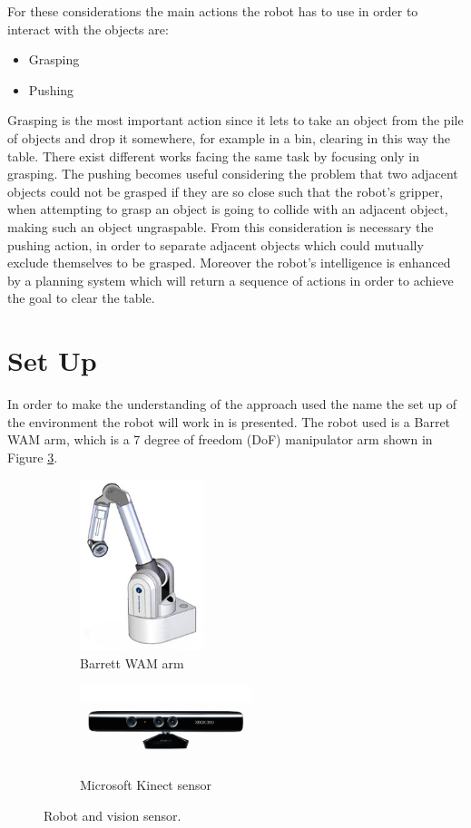 For these considerations the main actions the robot has to use in order to interact with the objects are:
\begin{itemize}
\item Grasping
\item Pushing
\end{itemize}
Grasping is the most important action since it lets to take an object from the pile of objects and drop it somewhere, for example in a bin, clearing in this way the table. There exist different works facing the same task by focusing only in grasping. The pushing becomes useful considering the problem that two adjacent objects could not be grasped if they are so close such that the robot's gripper, when attempting to grasp an object is going to collide with an adjacent object, making such an object ungraspable. From this consideration is necessary the pushing action, in order to separate adjacent objects which could mutually exclude themselves to be grasped. Moreover the robot's intelligence is enhanced by a planning system which will return a sequence of actions in order to achieve the goal to clear the table.  

\section{Set Up}
In order to make the understanding of the approach used the name the set up of the environment the robot will work in is presented. 
The robot used is a Barret WAM arm, which is a 7 degree of freedom (DoF) manipulator arm shown in Figure \ref{fig:wam_1}. 

\begin{figure}[htp]
\centering
\begin{subfigure}[b]{0.45\textwidth}
\centering
\includegraphics[height=5cm]{Img/set_up/wam.jpg}
\caption{Barrett WAM arm}\label{fig:wam_1}
\end{subfigure}
\begin{subfigure}[b]{0.45\textwidth}
\centering
\includegraphics[width=5cm]{Img/set_up/Kinect.jpg}
\caption{Microsoft Kinect sensor}\label{fig:wam_1}
\end{subfigure}
\caption{Robot and vision sensor.}
\end{figure}

